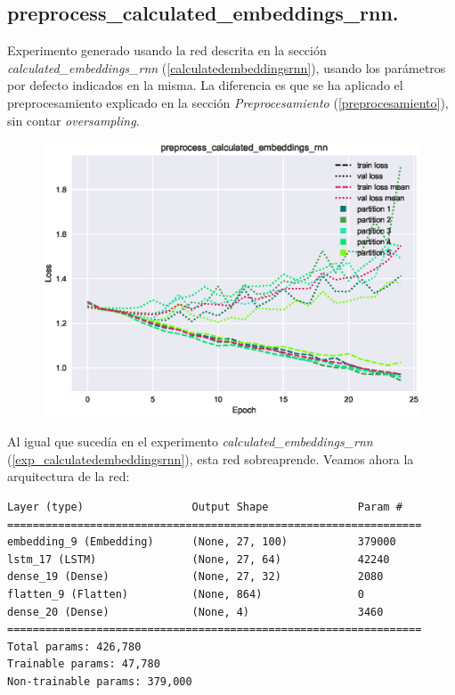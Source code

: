 \documentclass[11pt]{article}
\begin{document}
\subsection{preprocess\_calculated\_embeddings\_rnn.} \label{exp_preprocesscalculatedembeddingsrnn}

Experimento generado usando la red descrita en la sección \textit{calculated\_embeddings\_rnn} (\ref{calculatedembeddingsrnn}), usando los parámetros por defecto indicados en la misma. La diferencia es que se ha aplicado el preprocesamiento explicado en la sección \textit{Preprocesamiento} (\ref{preprocesamiento}), sin contar \textit{oversampling}.

\begin{figure}[H]
\includegraphics[width=\linewidth]{images/loss/preprocess_calculated_embeddings_rnn-1554206519.eps}
\end{figure}

Al igual que sucedía en el experimento \textit{calculated\_embeddings\_rnn} (\ref{exp_calculatedembeddingsrnn}), esta red sobreaprende. Veamos ahora la arquitectura de la red:

\begin{verbatim}
Layer (type)                 Output Shape              Param #   
=================================================================
embedding_9 (Embedding)      (None, 27, 100)           379000    
lstm_17 (LSTM)               (None, 27, 64)            42240     
dense_19 (Dense)             (None, 27, 32)            2080      
flatten_9 (Flatten)          (None, 864)               0         
dense_20 (Dense)             (None, 4)                 3460      
=================================================================
Total params: 426,780
Trainable params: 47,780
Non-trainable params: 379,000
\end{verbatim}
\end{document}

